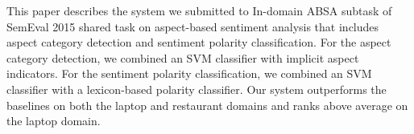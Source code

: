 This paper describes the system we submitted to In-domain ABSA subtask of SemEval 2015 shared task on aspect-based sentiment analysis that includes aspect category detection and sentiment polarity classification. For the aspect category detection, we combined an SVM classifier with implicit aspect indicators. For the sentiment polarity classification, we combined an SVM classifier with a lexicon-based polarity classifier. Our system outperforms the baselines on both the laptop and restaurant domains and ranks above average on the laptop domain.
